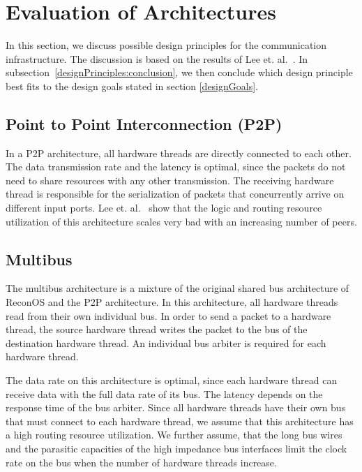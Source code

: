 \section{\label{evaluationOfDesignPrinciples}Evaluation of Architectures}
In this section, we discuss possible design principles for the communication infrastructure. The discussion is based on the results of Lee et. al.~\cite{communicationArchitectureExploration}. In subsection~\ref{designPrinciples:conclusion}, we then conclude which design principle best fits to the design goals stated in section \ref{designGoals}.

\subsection{\label{evaluation:p2p}Point to Point Interconnection (P2P)}
In a P2P architecture, all hardware threads are directly connected to each other. The data transmission rate and the latency is optimal, since the packets do not need to share resources with any other transmission. The receiving hardware thread is responsible for the serialization of packets that concurrently arrive on different input ports. Lee et. al.~\cite{communicationArchitectureExploration} show that the logic and routing resource utilization of this architecture scales very bad with an increasing number of peers.

\subsection{Multibus}
The multibus architecture is a mixture of the original shared bus architecture of ReconOS and the P2P architecture. In this architecture, all hardware threads read from their own individual bus. In order to send a packet to a hardware thread, the source hardware thread writes the packet to the bus of the destination hardware thread. An individual bus arbiter is required for each hardware thread.

The data rate on this architecture is optimal, since each hardware thread can receive data with the full data rate of its bus. The latency depends on the response time of the bus arbiter. Since all hardware threads have their own bus that must connect to each hardware thread, we assume that this architecture has a high routing resource utilization. We further assume, that the long bus wires and the parasitic capacities of the high impedance bus interfaces limit the clock rate on the bus when the number of hardware threads increase.

